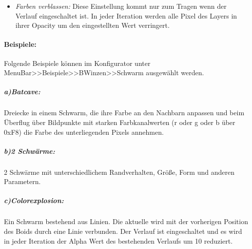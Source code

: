\documentclass[../mciAusarbeitung.tex]{subfiles}
\begin{document}
\begin{itemize}
	\item\textit{Farben verblassen:} Diese Einstellung kommt nur zum Tragen wenn der Verlauf eingeschaltet ist. In jeder Iteration werden alle Pixel des Layers in ihrer Opacity um den eingestellten Wert verringert.
\end{itemize}	
\paragraph{Beispiele:}
Folgende Beispiele können im Konfigurator unter MenuBar>>Beispiele>>BWinzen>>Schwarm ausgewählt werden.

	\subparagraph{a)Batcave:} Dreiecke in einem Schwarm, die ihre Farbe an den Nachbarn anpassen und beim Überflug über Bildpunkte mit starken Farbkanalwerten (r oder g oder b über 0xF8) die Farbe des unterliegenden Pixels annehmen.	
	
	\subparagraph{b)2 Schwärme:} 2 Schwärme mit unterschiedlichem Randverhalten, Größe, Form und anderen Parametern.

	\subparagraph{c)Colorexplosion:} Ein Schwarm bestehend aus Linien. Die aktuelle wird mit der vorherigen Position des Boids durch eine Linie verbunden. Der Verlauf ist eingeschaltet und es wird in jeder Iteration der Alpha Wert des bestehenden Verlaufs um 10 reduziert.
\end{document}
